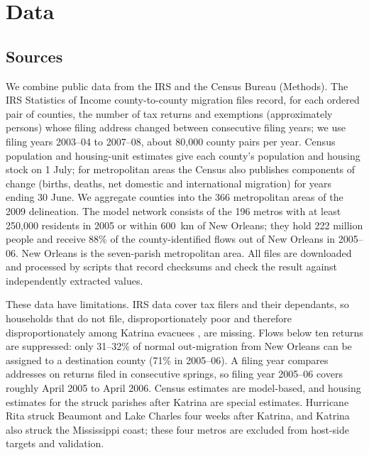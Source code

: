 \documentclass[11pt]{article}
\begin{document}
\section{Data}\label{sec:data}

\subsection{Sources}
We combine public data from the IRS and the Census Bureau (Methods). The IRS Statistics of Income county-to-county migration files record, for each ordered pair of counties, the number of tax returns and exemptions (approximately persons) whose filing address changed between consecutive filing years; we use filing years 2003--04 to 2007--08, about 80{,}000 county pairs per year. Census population and housing-unit estimates give each county's population and housing stock on 1 July; for metropolitan areas the Census also publishes components of change (births, deaths, net domestic and international migration) for years ending 30 June. We aggregate counties into the 366 metropolitan areas of the 2009 delineation. The model network consists of the 196 metros with at least 250{,}000 residents in 2005 or within 600~km of New Orleans; they hold 222 million people and receive 88\% of the county-identified flows out of New Orleans in 2005--06. New Orleans is the seven-parish metropolitan area. All files are downloaded and processed by scripts that record checksums and check the result against independently extracted values.

These data have limitations. IRS data cover tax filers and their dependants, so households that do not file, disproportionately poor and therefore disproportionately among Katrina evacuees \citep{Fussell2010}, are missing. Flows below ten returns are suppressed: only 31--32\% of normal out-migration from New Orleans can be assigned to a destination county (71\% in 2005--06). A filing year compares addresses on returns filed in consecutive springs, so filing year 2005--06 covers roughly April 2005 to April 2006. Census estimates are model-based, and housing estimates for the struck parishes after Katrina are special estimates. Hurricane Rita struck Beaumont and Lake Charles four weeks after Katrina, and Katrina also struck the Mississippi coast; these four metros are excluded from host-side targets and validation.
\end{document}
